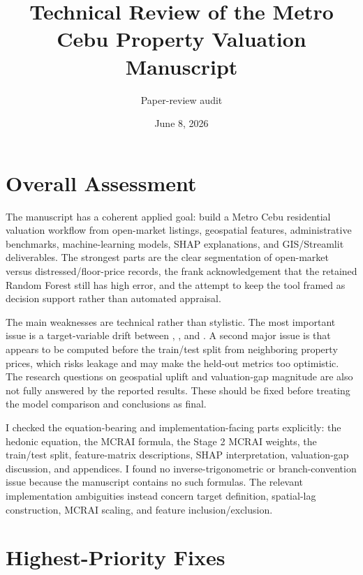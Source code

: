 \documentclass[11pt]{article}
\title{Technical Review of the Metro Cebu Property Valuation Manuscript}
\author{Paper-review audit}
\date{June 8, 2026}
\begin{document}
\maketitle

\section*{Overall Assessment}

The manuscript has a coherent applied goal: build a Metro Cebu residential valuation workflow from open-market listings, geospatial features, administrative benchmarks, machine-learning models, SHAP explanations, and GIS/Streamlit deliverables. The strongest parts are the clear segmentation of open-market versus distressed/floor-price records, the frank acknowledgement that the retained Random Forest still has high error, and the attempt to keep the tool framed as decision support rather than automated appraisal.

The main weaknesses are technical rather than stylistic. The most important issue is a target-variable drift between , , and . A second major issue is that  appears to be computed before the train/test split from neighboring property prices, which risks leakage and may make the held-out metrics too optimistic. The research questions on geospatial uplift and valuation-gap magnitude are also not fully answered by the reported results. These should be fixed before treating the model comparison and conclusions as final.

I checked the equation-bearing and implementation-facing parts explicitly: the hedonic equation, the MCRAI formula, the Stage 2 MCRAI weights, the train/test split, feature-matrix descriptions, SHAP interpretation, valuation-gap discussion, and appendices. I found no inverse-trigonometric or branch-convention issue because the manuscript contains no such formulas. The relevant implementation ambiguities instead concern target definition, spatial-lag construction, MCRAI scaling, and feature inclusion/exclusion.

\section*{Highest-Priority Fixes}
\end{document}
